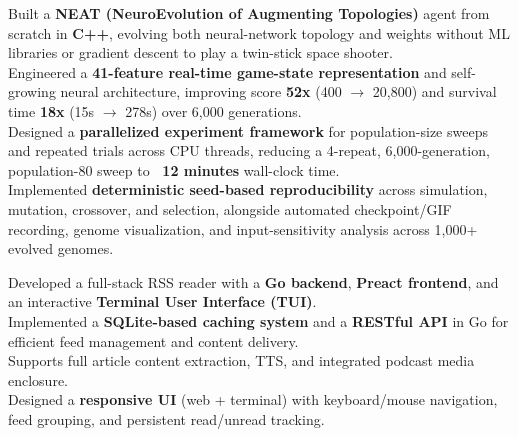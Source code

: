 \documentclass[]{Nikhil_Kadiyan_Resume}
\begin{document}
\pt Built a \textbf{NEAT (NeuroEvolution of Augmenting Topologies)} agent from scratch in \textbf{C++}, evolving both neural-network topology and weights without ML libraries or gradient descent to play a twin-stick space shooter.\\
\pt Engineered a \textbf{41-feature real-time game-state representation} and self-growing neural architecture, improving score \textbf{52x} (400 $\rightarrow$ 20,800) and survival time \textbf{18x} (15s $\rightarrow$ 278s) over 6,000 generations.\\
\pt Designed a \textbf{parallelized experiment framework} for population-size sweeps and repeated trials across CPU threads, reducing a 4-repeat, 6,000-generation, population-80 sweep to \textbf{~12 minutes} wall-clock time.\\
\pt Implemented \textbf{deterministic seed-based reproducibility} across simulation, mutation, crossover, and selection, alongside automated checkpoint/GIF recording, genome visualization, and input-sensitivity analysis across 1,000+ evolved genomes.\\
\sectionsep

\pt Developed a full-stack RSS reader with a \textbf{Go backend}, \textbf{Preact frontend}, and an interactive \textbf{Terminal User Interface (TUI)}.\\
\pt Implemented a \textbf{SQLite-based caching system} and a \textbf{RESTful API} in Go for efficient feed management and content delivery.\\
\pt Supports full article content extraction, TTS, and integrated podcast media enclosure.\\
\pt Designed a \textbf{responsive UI} (web + terminal) with keyboard/mouse navigation, feed grouping, and persistent read/unread tracking.\\
\sectionsep
\end{document}
